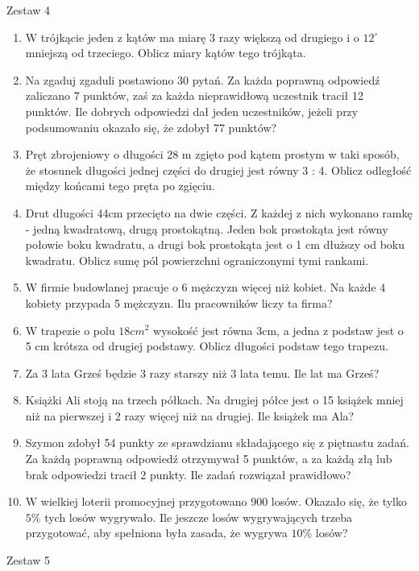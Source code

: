 \documentclass[12pt,a4paper]{article}
\begin{document}
\newpage
\LARGE \begin{center}
	Zestaw 4
\end{center}
\normalsize 
\begin{enumerate}[1.]
	\item W trójkącie jeden z kątów ma miarę 3 razy większą od drugiego i o $12^\circ$ mniejszą od trzeciego. Oblicz miary kątów tego trójkąta.
	\item Na zgaduj zgaduli postawiono 30 pytań. Za każda poprawną odpowiedź zaliczano
	7 punktów, zaś za każda nieprawidłową uczestnik tracił 12 punktów. Ile dobrych odpowiedzi dał jeden uczestników, jeżeli przy podsumowaniu okazało się, że zdobył 77 punktów?
	\item Pręt zbrojeniowy o długości 28 m zgięto pod kątem prostym w taki sposób, że stosunek długości jednej części do drugiej jest równy 3 : 4. Oblicz odległość między końcami tego pręta po zgięciu.
	\item Drut długości 44cm przecięto na dwie części. Z każdej z nich wykonano ramkę - jedną kwadratową, drugą prostokątną. Jeden bok prostokąta jest równy połowie boku kwadratu, a drugi bok prostokąta jest o 1 cm dłuższy od boku kwadratu. Oblicz sumę pól powierzchni ograniczonymi tymi rankami.
	\item W firmie budowlanej pracuje o 6 mężczyzn więcej niż kobiet. Na każde 4 kobiety przypada 5 mężczyzn. Ilu pracowników liczy ta firma?
	\item W trapezie o polu $18cm^2$ wysokość jest równa 3cm, a jedna z podstaw jest o 5 cm krótsza od drugiej podstawy. Oblicz długości podstaw tego trapezu.
	\item Za 3 lata Grześ będzie 3 razy starszy niż 3 lata temu. Ile lat ma Grześ?
	\item Książki Ali stoją na trzech półkach. Na drugiej półce jest o 15 książek mniej niż na pierwszej i 2 razy więcej niż na drugiej. Ile książek ma Ala?
	\item Szymon zdobył 54 punkty ze sprawdzianu składającego się z piętnastu zadań. Za każdą poprawną odpowiedź otrzymywał 5 punktów, a za każdą złą lub brak odpowiedzi tracił 2 punkty. Ile zadań rozwiązał prawidłowo?
	\item W wielkiej loterii promocyjnej przygotowano 900 losów. Okazało się, że tylko $5\%$ tych losów wygrywało. Ile jeszcze losów wygrywających trzeba przygotować, aby spełniona była zasada, że wygrywa $10\%$ losów?
\end{enumerate}
\newpage
\LARGE \begin{center}
	Zestaw 5
\end{center}
\end{document}
